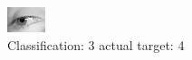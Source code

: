 \begin{figure}[h!]
\begin{center}
\includegraphics[width=0.60\columnwidth]{figures/ID3000_class_3_target_4.png}
\end{center}
\caption{ Classification: 3 actual target: 4}
\label{fig:ID3000_class_3_target_4}
\end{figure}
